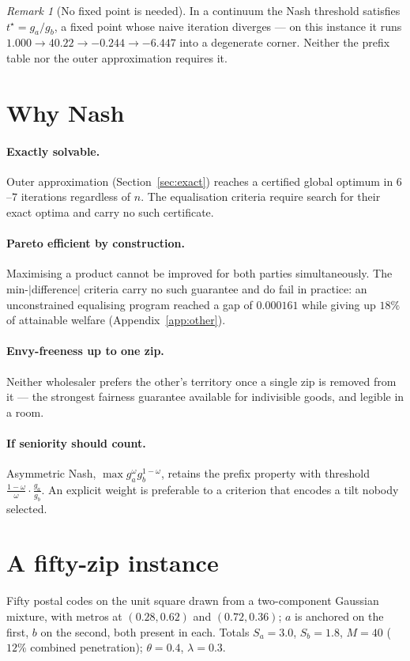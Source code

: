 \documentclass[11pt]{article}
\theoremstyle{remark}\newtheorem*{remark}{Remark}
\newcommand{\Sa}{S_a}\newcommand{\Sb}{S_b}\newcommand{\Amax}{G_a^{\max}}\newcommand{\Bmax}{G_b^{\max}}
\begin{document}
\begin{remark}[No fixed point is needed]
In a continuum the Nash threshold satisfies $t^\star=g_a/g_b$, a fixed point whose
naive iteration diverges --- on this instance it runs
$1.000\to40.22\to-0.244\to-6.447$ into a degenerate corner. Neither the prefix table nor
the outer approximation requires it.
\end{remark}

\section{Why Nash}\label{sec:why}
\paragraph{Exactly solvable.} Outer approximation (Section~\ref{sec:exact}) reaches a
certified global optimum in $6$--$7$ iterations regardless of $n$. The equalisation
criteria require search for their exact optima and carry no such certificate.

\paragraph{Pareto efficient by construction.} Maximising a product cannot be improved
for both parties simultaneously. The min-$|$difference$|$ criteria carry no such
guarantee and do fail in practice: an unconstrained equalising program reached a gap of
$0.000161$ while giving up $18\%$ of attainable welfare (Appendix~\ref{app:other}).

\paragraph{Envy-freeness up to one zip.} Neither wholesaler prefers the other's
territory once a single zip is removed from it --- the strongest fairness guarantee
available for indivisible goods, and legible in a room.

\paragraph{If seniority should count.} Asymmetric Nash,
$\max g_a^{\omega}g_b^{1-\omega}$, retains the prefix property with threshold
$\tfrac{1-\omega}{\omega}\cdot\tfrac{g_a}{g_b}$. An explicit weight is preferable to a
criterion that encodes a tilt nobody selected.

\section{A fifty-zip instance}\label{sec:instance}
Fifty postal codes on the unit square drawn from a two-component Gaussian mixture, with
metros at $(0.28,0.62)$ and $(0.72,0.36)$; $a$ is anchored on the first, $b$ on the
second, both present in each. Totals $\Sa=3.0$, $\Sb=1.8$, $M=40$ ($12\%$ combined
penetration); $\theta=0.4$, $\lambda=0.3$.
\end{document}
